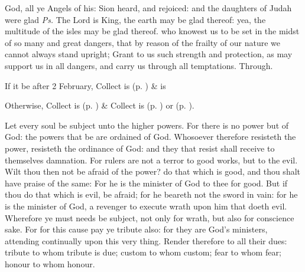 \introit
{} God, all ye Angels of his: Sion heard, and rejoiced: and the daughters of Judah were glad \textit{Ps.} The Lord is King, the earth may be glad thereof: yea, the multitude of the isles may be glad thereof.
\collect
{} who knowest us to be set in the midst of so many and great dangers, that by reason of the frailty of our nature we cannot always stand upright; Grant to us such strength and protection, as may support us in all dangers, and carry us through all temptations. Through.
\begin{rubric}
    If it be after 2 February,  Collect is  (p. \pageref{SPSaints}) \&  is 
\end{rubric}
\begin{rubric}
	Otherwise,  Collect is  (p. \pageref{SPMaryPostChristmas}) \&  Collect is  (p. \pageref{SPAgainst}) or  (p. \pageref{SPChiefBishop}).
\end{rubric}
 Let every soul be subject unto the higher powers. For there is no power but of God: the powers that be are ordained of God. Whosoever therefore resisteth the power, resisteth the ordinance of God: and they that resist shall receive to themselves damnation. For rulers are not a terror to good works, but to the evil. Wilt thou then not be afraid of the power? do that which is good, and thou shalt have praise of the same: For he is the minister of God to thee for good. But if thou do that which is evil, be afraid; for he beareth not the sword in vain: for he is the minister of God, a revenger to execute wrath upon him that doeth evil. Wherefore ye must needs be subject, not only for wrath, but also for conscience sake. For for this cause pay ye tribute also: for they are God's ministers, attending continually upon this very thing. Render therefore to all their dues: tribute to whom tribute is due; custom to whom custom; fear to whom fear; honour to whom honour.


